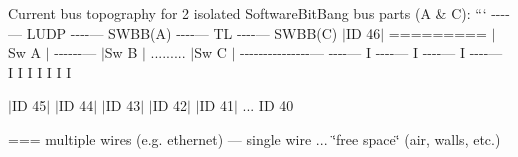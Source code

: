 Current bus topography for 2 isolated Software\-Bit\-Bang bus parts (A \& C)\-: ``` -\/-\/-\/-\/--- L\-U\-D\-P -\/-\/-\/-\/--- S\-W\-B\-B(\-A) -\/-\/-\/-\/--- T\-L -\/-\/-\/-\/--- S\-W\-B\-B(\-C) $\vert$\-I\-D 46$\vert$ ========= $\vert$\-Sw A $\vert$ -\/-\/-\/-\/-\/-\/--- $\vert$\-Sw B $\vert$ ......... $\vert$\-Sw C $\vert$ -\/-\/-\/-\/-\/-\/-\/-\/-\/-\/-\/-\/-\/-\/-\/--- -\/-\/-\/-\/--- I -\/-\/-\/-\/--- I -\/-\/-\/-\/--- I -\/-\/-\/-\/--- I I I I I I I 

 $\vert$\-I\-D 45$\vert$ $\vert$\-I\-D 44$\vert$ $\vert$\-I\-D 43$\vert$ $\vert$\-I\-D 42$\vert$ $\vert$\-I\-D 41$\vert$ ... I\-D 40 



=== multiple wires (e.\-g. ethernet) --- single wire ... \char`\"{}free space\char`\"{} (air, walls, etc.)



